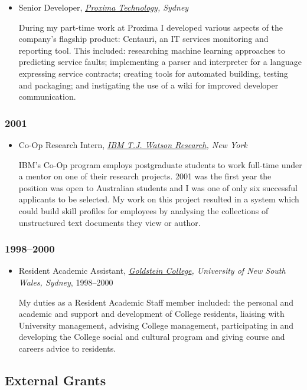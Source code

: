 \documentclass{article}
\begin{document}
\begin{itemize}%
\item Senior Developer, \emph{\href{http://www.computerworld.com.au/article/177083/compuware_acquires_local_r_d_centre/}{Proxima Technology}, Sydney}

During my part-time work at Proxima I developed various aspects of the company'{}s flagship product: Centauri, an IT services monitoring and reporting tool. This included: researching machine learning approaches to predicting service faults; implementing a parser and interpreter for a language expressing service contracts; creating tools for automated building, testing and packaging; and instigating the use of a wiki for improved developer communication.



\end{itemize}
\hypertarget{2001}{}\subsubsection*{{2001}}\label{2001}

\begin{itemize}%
\item Co-Op Research Intern, \emph{\href{http://www.watson.ibm.com/index.shtml}{IBM T.J. Watson Research}, New York}

IBM'{}s Co-Op program employs postgraduate students to work full-time under a mentor on one of their research projects. 2001 was the first year the position was open to Australian students and I was one of only six successful applicants to be selected. My work on this project resulted in a system which could build skill profiles for employees by analysing the collections of unstructured text documents they view or author.



\end{itemize}
\hypertarget{19982000}{}\subsubsection*{{1998--{}2000}}\label{19982000}

\begin{itemize}%
\item Resident Academic Assistant, \emph{\href{http://www.kensingtoncolleges.unsw.edu.au/}{Goldstein College}, University of New South Wales, Sydney}, 1998--{}2000

My duties as a Resident Academic Staff member included: the personal and academic and support and development of College residents, liaising with University management, advising College management, participating in and developing the College social and cultural program and giving course and careers advice to residents.



\end{itemize}
\hypertarget{external_grants}{}\subsection*{{External Grants}}\label{external_grants}
\end{document}
